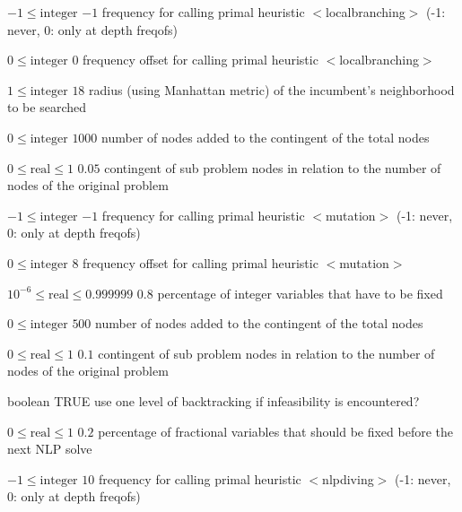 %
{$-1\leq\textrm{integer}$}%
{$-1$}%
{frequency for calling primal heuristic $<$localbranching$>$ (-1: never, 0: only at depth freqofs)}%
{}

%
{$0\leq\textrm{integer}$}%
{$0$}%
{frequency offset for calling primal heuristic $<$localbranching$>$}%
{}

%
{$1\leq\textrm{integer}$}%
{$18$}%
{radius (using Manhattan metric) of the incumbent's neighborhood to be searched}%
{}

%
{$0\leq\textrm{integer}$}%
{$1000$}%
{number of nodes added to the contingent of the total nodes}%
{}

%
{$0\leq\textrm{real}\leq1$}%
{$0.05$}%
{contingent of sub problem nodes in relation to the number of nodes of the original problem}%
{}

%
{$-1\leq\textrm{integer}$}%
{$-1$}%
{frequency for calling primal heuristic $<$mutation$>$ (-1: never, 0: only at depth freqofs)}%
{}

%
{$0\leq\textrm{integer}$}%
{$8$}%
{frequency offset for calling primal heuristic $<$mutation$>$}%
{}

%
{$10^{- 6}\leq\textrm{real}\leq0.999999$}%
{$0.8$}%
{percentage of integer variables that have to be fixed}%
{}

%
{$0\leq\textrm{integer}$}%
{$500$}%
{number of nodes added to the contingent of the total nodes}%
{}

%
{$0\leq\textrm{real}\leq1$}%
{$0.1$}%
{contingent of sub problem nodes in relation to the number of nodes of the original problem}%
{}

%
{boolean}%
{TRUE}%
{use one level of backtracking if infeasibility is encountered?}%
{}

%
{$0\leq\textrm{real}\leq1$}%
{$0.2$}%
{percentage of fractional variables that should be fixed before the next NLP solve}%
{}

%
{$-1\leq\textrm{integer}$}%
{$10$}%
{frequency for calling primal heuristic $<$nlpdiving$>$ (-1: never, 0: only at depth freqofs)}%
{}

